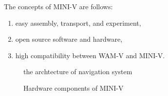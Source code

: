 \documentclass[lettersize,journal]{IEEEtran}
\begin{document}
The concepts of MINI-V are follows:
\begin{enumerate}
  \item easy assembly, transport, and experiment,
  \item open source software and hardware,
  \item high compatibility between WAM-V and MINI-V.
\end{enumerate}

\begin{figure}[htbp]
  \begin{center}
  \end{center}
  \caption{the archtecture of navigation system}
  \label{fig:arch_nav}
\end{figure}

\begin{figure}[htbp]
    \begin{center}
  \end{center}
  \caption{Hardware components of MINI-V}
  \label{fig:mini_v_component}
\end{figure}
\end{document}
